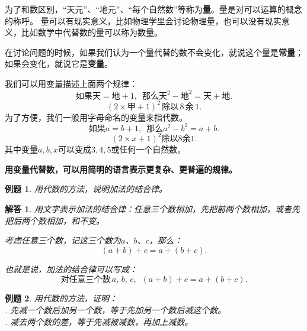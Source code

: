 \documentclass[12pt,UTF8]{ctexbook}
\newtheorem{et}{例题}[section]
\newtheorem*{so}{解答}
\begin{document}
为了和数区别，“天元”、“地元”、“每个自然数”等称为\textbf{量}。量是对可以运算的概念的称呼。
量可以有现实意义，比如物理学里会讨论物理量，也可以没有现实意义，比如数学中代替数的量可以称为数量。

在讨论问题的时候，如果我们认为一个量代替的数不会变化，就说这个量是\textbf{常量}；如果会变化，就说它是\textbf{变量}。

我们可以用变量描述上面两个规律：
$$ \mbox{如果天} = \mbox{地}+1, \,\,\,\mbox{那么}\mbox{天}^2 - \mbox{地}^2 = \mbox{天} + \mbox{地}. $$
$$  (2\times \mbox{甲} + 1)^2 \,\mbox{除以} \,8\,\mbox{余}\,1.$$
为了方便，我们一般用字母命名的变量来指代数。
$$ \mbox{如果} a = b+1, \,\,\,\mbox{那么} a^2 - b^2 = a + b. $$
$$  (2\times x + 1)^2 \mbox{除以} 8\mbox{余} 1.$$
其中变量$a,b,x$可以变成$3,4,5$或任何一个自然数。

\textbf{用变量代替数，可以用简明的语言表示更复杂、更普遍的规律。}

\begin{et}
    用代数的方法，说明加法的结合律。
\end{et}

\begin{so}
    用文字表示加法的结合律：任意三个数相加，先把前两个数相加，或者先把后两个数相加，和不变。

    考虑任意三个数，记这三个数为$a$、$b$、$c$，那么：
    $$ (a + b) + c = a + (b + c).$$

    也就是说，加法的结合律可以写成：
    $$ \mbox{对任意三个数}\,a,\,b,\,c, \,\,\, (a + b) + c = a + (b + c).$$

\end{so}

\begin{et}
    用代数的方法，证明：\\
    . 先减一个数后加另一个数，等于先加另一个数后减这个数。\\
    . 减去两个数的差，等于先减被减数，再加上减数。\\
\end{et}
\end{document}
